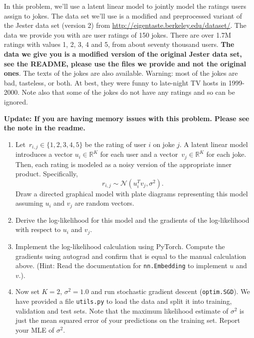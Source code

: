 \documentclass[submit]{harvardml}
\newcommand{\R}{\mathbb{R}}
\theoremstyle{plain}
\begin{document}
\newpage
\begin{problem}
In this problem, we'll use a latent linear model to jointly model the ratings
users assign to jokes. The data set we'll use is a modified and preprocessed
variant of the Jester data set (version 2) from
\url{http://eigentaste.berkeley.edu/dataset/}. The data we provide you with are user
ratings of 150 jokes. There are over 1.7M ratings with values 1, 2, 3, 4 and 5,
from about seventy thousand users. {\bf The data we give you is a modified version of the original Jester data set, see the README,
please use the files we provide and not the original ones}. The texts of the jokes are also available.
Warning: most of the jokes are bad, tasteless, or both. At best, they were
funny to late-night TV hosts in 1999-2000. Note also that some of the jokes do
not have any ratings and so can be ignored.

\textbf{Update: If you are having memory issues with this problem. Please see the note in the
readme.}

\begin{enumerate}[label=(\alph*)]
\item
Let~${r_{i,j}\in\{1,2,3,4,5\}}$ be the rating of user $i$ on joke $j$.  A latent linear model introduces a vector ${u_i\in\R^K}$ for each user and a vector~${v_j\in\R^K}$ for each joke.  Then, each rating is modeled as a noisy version of the appropriate inner product. Specifically,
\[
r_{i,j} \sim \mathcal{N}(u_i^T v_j, \sigma^2).
\]
Draw a directed graphical model with plate diagrams representing this model assuming $u_i$ and $v_j$ are random vectors.

\item Derive the log-likelihood for this model and the gradients of the log-likelihood with respect to $u_i$ and $v_j$.

\item Implement the log-likelihood calculation using PyTorch.  Compute
  the gradients using autograd and confirm that is equal to the
  manual calculation above. (Hint: Read the documentation for \texttt{nn.Embedding}
  to implement $u$ and $v$.).

\item Now set $K = 2$, $\sigma^2=1.0$ and run stochastic gradient
    descent (\texttt{optim.SGD}). We have provided a file \texttt{utils.py} to load the
    data and split it into training, validation and test sets. Note that the maximum
  likelihood estimate of $\sigma^2$ is just the mean squared error of
  your predictions on the training set. Report your MLE of $\sigma^2$.


\end{enumerate}
\end{problem}
\end{document}
